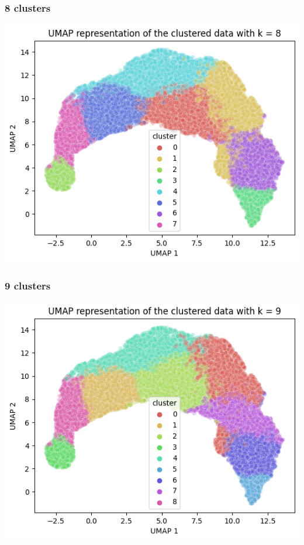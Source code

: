 \documentclass{article}
\begin{document}
\subsubsection*{8 clusters}

\begin{center}
    \includegraphics[scale=0.5]{./img/umap_8.png}
\end{center}

\subsubsection*{9 clusters}

\begin{center}
    \includegraphics[scale=0.5]{./img/umap_9.png}
\end{center}
\end{document}
